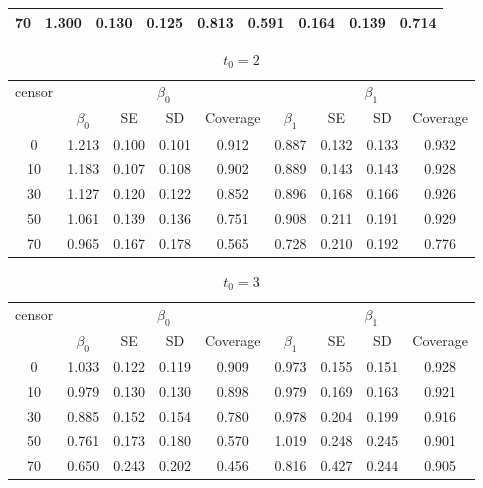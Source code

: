 \documentclass[12pt]{article}
\begin{document}
\begin{enumerate}
\begin{table}[hbt!]
\begin{tabular}{|c|c|c|c|c|c|c|c|c|}
  70 & 1.300 & 0.130 & 0.125 & 0.813 & 0.591 & 0.164 & 0.139 & 0.714 \\ 
				\hline
			\end{tabular}
		\end{table}
		\begin{table}[hbt!]
			\caption{$t_0=2$}
			\centering
			\begin{tabular}{|c|c|c|c|c|c|c|c|c|}
				\hline
				\multirow{2}{*}{censor} & \multicolumn{4}{c|}{$\beta_0$} & \multicolumn{4}{c|}{$\beta_1$}\\ \cline{2-9}
				& $\beta_0$ & SE & SD  & Coverage  & $\beta_1$ & SE & SD & Coverage\\
				\hline\hline
				0 & 1.213 & 0.100 & 0.101 & 0.912 & 0.887 & 0.132 & 0.133 & 0.932 \\ 
				10 & 1.183 & 0.107 & 0.108 & 0.902 & 0.889 & 0.143 & 0.143 & 0.928 \\ 
				30 & 1.127 & 0.120 & 0.122 & 0.852 & 0.896 & 0.168 & 0.166 & 0.926 \\ 
				50 & 1.061 & 0.139 & 0.136 & 0.751 & 0.908 & 0.211 & 0.191 & 0.929 \\ 
				70 & 0.965 & 0.167 & 0.178 & 0.565 & 0.728 & 0.210 & 0.192 & 0.776 \\ 
				\hline
			\end{tabular}
		\end{table}
		\begin{table}[hbt!]
			\caption{$t_0=3$}
			\centering
			\begin{tabular}{|c|c|c|c|c|c|c|c|c|}
				\hline
				\multirow{2}{*}{censor} & \multicolumn{4}{c|}{$\beta_0$} & \multicolumn{4}{c|}{$\beta_1$}\\ \cline{2-9}
				& $\beta_0$ & SE & SD  & Coverage  & $\beta_1$ & SE & SD & Coverage\\
				\hline\hline
				0 & 1.033 & 0.122 & 0.119 & 0.909 & 0.973 & 0.155 & 0.151 & 0.928 \\ 
  10 & 0.979 & 0.130 & 0.130 & 0.898 & 0.979 & 0.169 & 0.163 & 0.921 \\ 
  30 & 0.885 & 0.152 & 0.154 & 0.780 & 0.978 & 0.204 & 0.199 & 0.916 \\ 
  50 & 0.761 & 0.173 & 0.180 & 0.570 & 1.019 & 0.248 & 0.245 & 0.901 \\ 
  70 & 0.650 & 0.243 & 0.202 & 0.456 & 0.816 & 0.427 & 0.244 & 0.905 \\
				\hline
			\end{tabular}
		\end{table}
	
		\newpage
		

\end{enumerate}
\end{document}
